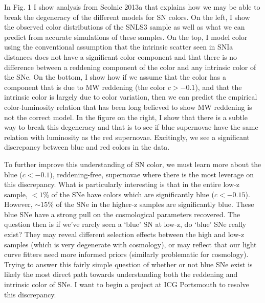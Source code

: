 \documentclass[12pt,preprint]{aastex}
\begin{document}
In Fig. 1 I show analysis from Scolnic 2013a that explains how we may be able to break the degeneracy of the different models for SN colors.  On the left, I show the observed color distributions of the SNLS3 sample as well as what we can predict from accurate simulations of these samples.  On the top, I model color using the conventional assumption that the intrinsic scatter seen in SNIa distances does not have a significant color component and that there is no difference between a reddening component of the color and any intrinsic color of the SNe.  On the bottom, I show how if we assume that the color has a component that is due to MW reddening (the color $c>-0.1$), and that the intrinsic color is largely due to color variation, then we can predict the empirical color-luminosity relation that has been long believed to show MW reddening is not the correct model.  In the figure on the right, I show that there is a subtle way to break this degeneracy and that is to see if blue supernovae have the same relation with luminosity as the red supernovae.  Excitingly, we see a significant discrepancy between blue and red colors in the data. 

To further improve this understanding of SN color, we must learn more about the blue ($c<-0.1$), reddening-free, supernovae where there is the most leverage on this discrepancy.  What is particularly interesting is that in the entire low-z sample, $<1\%$ of the SNe have colors which are significantly blue ($c<-0.15$).  However, $\sim 15\%$ of the SNe in the higher-z samples are significantly blue.  These blue SNe have a strong pull on the cosmological parameters recovered.  The question then is if we've rarely seen a `blue' SN at low-z, do `blue' SNe really exist?  They may reveal different selection effects between the high and low-z samples (which is very degenerate with cosmology), or may reflect that our light curve fitters need more informed priors (similarly problematic for cosmology).  Trying to answer this fairly simple question of whether or not blue SNe exist is likely the most direct path towards understanding both the reddening and intrinsic color of SNe.   I want to begin a project at ICG Portsmouth to resolve this discrepancy.  
\end{document}

